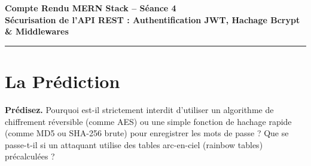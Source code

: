 \documentclass[12pt,a4paper]{article}
\begin{document}

\tableofcontents %
\clearpage
\listoffigures  %
\clearpage

\begin{center}

    {\LARGE \textbf{Compte Rendu MERN Stack -- Séance 4}}\\[0.2cm]

    {\large \textbf{Sécurisation de l'API REST : Authentification JWT, Hachage Bcrypt \& Middlewares}}\\[0.15cm]

    \vspace{0.3cm}

    \hrule

\end{center}

\vspace{0.5cm}

\section{La Prédiction}

\begin{tcolorbox}[
    colback=orange!5,
    colframe=orange!80!black,
    boxrule=1pt,
    arc=5pt,
    left=8pt,
    right=8pt,
    top=5pt,
    bottom=5pt
]
\textcolor{orange!80!black}{\textbf{Prédisez.}}
\quad Pourquoi est-il strictement interdit d'utiliser un algorithme de chiffrement réversible (comme AES) ou une simple fonction de hachage rapide (comme MD5 ou SHA-256 brute) pour enregistrer les mots de passe ? Que se passe-t-il si un attaquant utilise des tables arc-en-ciel (rainbow tables) précalculées ?
\end{tcolorbox}
\end{document}
